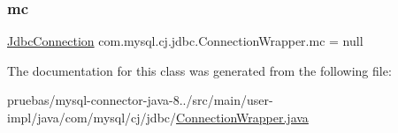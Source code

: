 \subsubsection{\texorpdfstring{mc}{mc}}
{\footnotesize\ttfamily \mbox{\hyperlink{interfacecom_1_1mysql_1_1cj_1_1jdbc_1_1_jdbc_connection}{Jdbc\+Connection}} com.\+mysql.\+cj.\+jdbc.\+Connection\+Wrapper.\+mc = null\hspace{0.3cm}{\ttfamily [protected]}}



The documentation for this class was generated from the following file\+:\begin{DoxyCompactItemize}
\item 
pruebas/mysql-\/connector-\/java-\/8../src/main/user-\/impl/java/com/mysql/cj/jdbc/\mbox{\hyperlink{_connection_wrapper_8java}{Connection\+Wrapper.\+java}}\end{DoxyCompactItemize}
